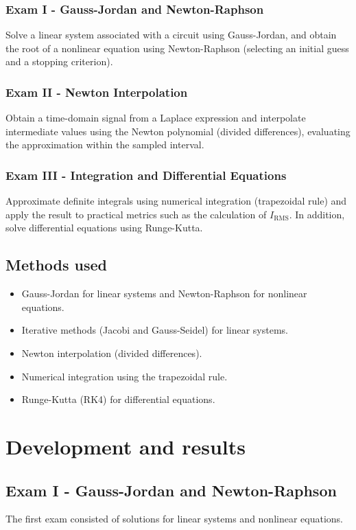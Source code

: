 \documentclass[pdflatex,sn-mathphys-num]{sn-jnl}%
\begin{document}
\subsubsection{Exam I - Gauss-Jordan and Newton-Raphson}
Solve a linear system associated with a circuit using Gauss-Jordan, and obtain the root of a nonlinear equation using Newton-Raphson (selecting an initial guess and a stopping criterion).

\subsubsection{Exam II - Newton Interpolation}
Obtain a time-domain signal from a Laplace expression and interpolate intermediate values using the Newton polynomial (divided differences), evaluating the approximation within the sampled interval.

\subsubsection{Exam III - Integration and Differential Equations}
Approximate definite integrals using numerical integration (trapezoidal rule) and apply the result to practical metrics such as the calculation of $I_{\mathrm{RMS}}$. In addition, solve differential equations using Runge-Kutta.


\subsection{Methods used}
\begin{itemize}
    \item Gauss-Jordan for linear systems and Newton-Raphson for nonlinear equations.
    \item Iterative methods (Jacobi and Gauss-Seidel) for linear systems.
    \item Newton interpolation (divided differences).
    \item Numerical integration using the trapezoidal rule.
    \item Runge-Kutta (RK4) for differential equations.
\end{itemize}
\section{Development and results}
\subsection{Exam I - Gauss-Jordan and Newton-Raphson}
The first exam consisted of solutions for linear systems and nonlinear equations.
\end{document}
